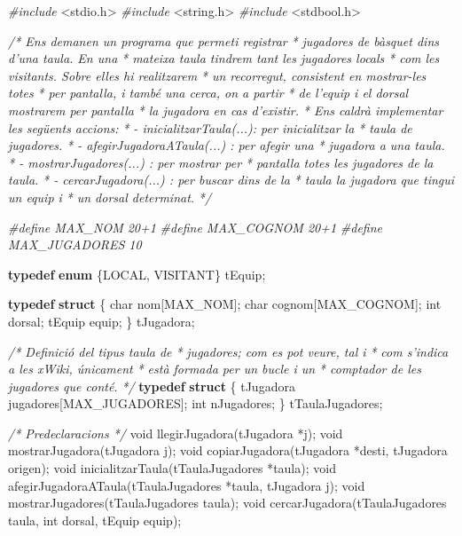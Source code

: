 \documentclass[]{book}
\newenvironment{Shaded}{\begin{snugshade}}{\end{snugshade}}
\newcommand{\KeywordTok}[1]{\textcolor[rgb]{0.13,0.29,0.53}{\textbf{#1}}}
\newcommand{\DataTypeTok}[1]{\textcolor[rgb]{0.13,0.29,0.53}{#1}}
\newcommand{\ImportTok}[1]{#1}
\newcommand{\CommentTok}[1]{\textcolor[rgb]{0.56,0.35,0.01}{\textit{#1}}}
\newcommand{\PreprocessorTok}[1]{\textcolor[rgb]{0.56,0.35,0.01}{\textit{#1}}}
\newcommand{\NormalTok}[1]{#1}
\begin{document}
\begin{Shaded}
\begin{Highlighting}[]
\PreprocessorTok{#include }\ImportTok{<stdio.h>}
\PreprocessorTok{#include }\ImportTok{<string.h>}
\PreprocessorTok{#include }\ImportTok{<stdbool.h>}

\CommentTok{/* Ens demanen un programa que permeti registrar}
\CommentTok{ * jugadores de bàsquet dins d'una taula. En una}
\CommentTok{ * mateixa taula tindrem tant les jugadores locals}
\CommentTok{ * com les visitants. Sobre elles hi realitzarem}
\CommentTok{ * un recorregut, consistent en mostrar-les totes}
\CommentTok{ * per pantalla, i també una cerca, on a partir }
\CommentTok{ * de l'equip i el dorsal mostrarem per pantalla}
\CommentTok{ * la jugadora en cas d'existir.}
\CommentTok{ * Ens caldrà implementar les següents accions:}
\CommentTok{ * - inicialitzarTaula(...): per inicialitzar la}
\CommentTok{ *   taula de jugadores.}
\CommentTok{ * - afegirJugadoraATaula(...) : per afegir una}
\CommentTok{ *   jugadora a una taula.}
\CommentTok{ * - mostrarJugadores(...) : per mostrar per }
\CommentTok{ *   pantalla totes les jugadores de la taula.}
\CommentTok{ * - cercarJugadora(...) : per buscar dins de la}
\CommentTok{ *   taula la jugadora que tingui un equip i }
\CommentTok{ *   un dorsal determinat.}
\CommentTok{ */}
 
\PreprocessorTok{#define MAX_NOM 20+1}
\PreprocessorTok{#define MAX_COGNOM 20+1}
\PreprocessorTok{#define MAX_JUGADORES 10}

\KeywordTok{typedef} \KeywordTok{enum}\NormalTok{ \{LOCAL, VISITANT\} tEquip;}

\KeywordTok{typedef} \KeywordTok{struct}\NormalTok{ \{}
    \DataTypeTok{char}\NormalTok{ nom[MAX_NOM];}
    \DataTypeTok{char}\NormalTok{ cognom[MAX_COGNOM];}
    \DataTypeTok{int}\NormalTok{ dorsal;}
\NormalTok{    tEquip equip;}
\NormalTok{\} tJugadora;}

\CommentTok{/* Definició del tipus taula de}
\CommentTok{ * jugadores; com es pot veure, tal i }
\CommentTok{ * com s'indica a les xWiki, únicament}
\CommentTok{ * està formada per un bucle i un }
\CommentTok{ * comptador de les jugadores que conté.}
\CommentTok{ */}
\KeywordTok{typedef} \KeywordTok{struct}\NormalTok{ \{}
\NormalTok{    tJugadora jugadores[MAX_JUGADORES];}
    \DataTypeTok{int}\NormalTok{ nJugadores;}
\NormalTok{\} tTaulaJugadores;}

\CommentTok{/* Predeclaracions */}
\DataTypeTok{void}\NormalTok{ llegirJugadora(tJugadora *j);}
\DataTypeTok{void}\NormalTok{ mostrarJugadora(tJugadora j);}
\DataTypeTok{void}\NormalTok{ copiarJugadora(tJugadora *desti, tJugadora origen);}
\DataTypeTok{void}\NormalTok{ inicialitzarTaula(tTaulaJugadores *taula);}
\DataTypeTok{void}\NormalTok{ afegirJugadoraATaula(tTaulaJugadores *taula, tJugadora j);}
\DataTypeTok{void}\NormalTok{ mostrarJugadores(tTaulaJugadores taula);}
\DataTypeTok{void}\NormalTok{ cercarJugadora(tTaulaJugadores taula, }\DataTypeTok{int}\NormalTok{ dorsal, tEquip equip);}


\end{Highlighting}
\end{Shaded}
\end{document}
